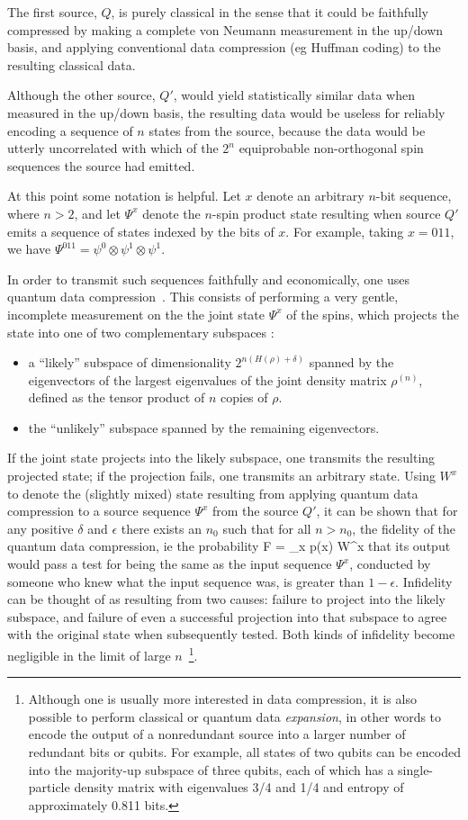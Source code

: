 The first source, $Q$, is purely classical in the sense that it could
be faithfully compressed by making a complete von Neumann
measurement in the up/down basis, and applying conventional data
compression (eg Huffman coding) to the resulting classical data.
 
Although the other source, $Q'$, would yield statistically
similar data when measured in the up/down basis, the resulting
data would be useless for reliably encoding a sequence of $n$
states from the source, because the data would
be utterly uncorrelated with which of the $2^n$ equiprobable
non-orthogonal spin sequences the source had emitted.
 
At this point some notation is helpful.  Let $x$ denote an arbitrary
$n$-bit sequence, where $n>2$, and let $\Psi^x$ denote the $n$-spin
product state resulting when source $Q'$ emits a sequence of states
indexed by the bits of $x$.  For example, taking $x=011$, we have
$\Psi^{011} = \psi^0 \otimes \psi^1 \otimes \psi^1$.
 
In order to transmit such sequences faithfully and economically,
one uses quantum data compression~\cite{JS94,Schu95}.  This consists of
performing a very gentle, incomplete measurement on the the joint state
$\Psi^x$ of the spins, which projects the state into one of two complementary
subspaces :
 \begin{itemize}
 \item a ``likely'' subspace of
dimensionality $2^{n(H(\rho)+\delta)}$ spanned by the eigenvectors of
the largest eigenvalues of the joint density matrix $\rho^{(n)}$, defined
as the tensor product of $n$ copies of $\rho$.
 \item the ``unlikely'' subspace spanned by the remaining eigenvectors.
\end{itemize}\noindent
If the joint state projects into the likely
subspace, one transmits the resulting projected state; if the
projection fails, one transmits an arbitrary state.  Using $W^x$ to
denote the (slightly mixed) state resulting from applying quantum data
compression to a source sequence $\Psi^x$ from the source $Q'$, it
can be shown that  for any positive $\delta$ and $\epsilon$ there exists
an $n_0$ such that for all $n>n_0$, the fidelity of the quantum
data compression, ie the probability
 \beq
 F = \sum_x p(x) W^x
 \eeq that its output would pass a test for being the same as the input
sequence $\Psi^x$, conducted by someone who knew what the input sequence
was, is greater than $1-\epsilon$. Infidelity can be thought of as
resulting from two causes: failure to project into the likely subspace,
and failure of even a successful projection into that subspace to agree
with the original state when subsequently tested.  Both kinds of
infidelity become negligible in the limit of large
$n$~\footnote{Although one is usually more interested in data
compression, it is also possible to perform classical or quantum data
{\em expansion\/}, in other words to encode the output of a nonredundant
source into a larger number of redundant bits or qubits. For example,
all states of two qubits can be encoded into the majority-up subspace
of three qubits, each of which has a single-particle density matrix with
eigenvalues 3/4 and 1/4 and entropy of approximately 0.811 bits.}.
 
